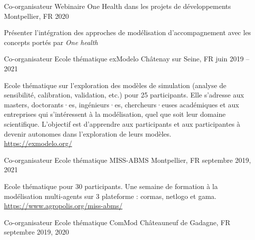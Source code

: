 \begin{cventries}
      \cventry
        {Co-organisateur} %
        {Webinaire One Health dans les projets de développements} %
        {Montpellier, FR} %
        {2020} %
        {
          \begin{cvitems} %
            Présenter l'intégration des approches de modélisation d'accompagnement avec les concepts portés par \textit{One health}
          \end{cvitems}
        }

    \cventry
      {Co-organisateur} %
      {Ecole thématique exModelo} %
      {Châtenay sur Seine, FR} %
      {juin 2019 -- 2021} %
      {
        \begin{cvitems} %
          Ecole thématique sur l’exploration des modèles de simulation (analyse de sensibilité, calibration, validation, etc.) pour 25 participants. Elle s’adresse aux masters, doctorants·es, ingénieurs·es, chercheurs·euses académiques et aux entreprises qui s’intéressent à la modélisation, quel que soit leur domaine scientifique. L’objectif est d’apprendre aux participants et aux participantes à devenir autonomes dans l’exploration de leurs modèles.\\
          \url{https://exmodelo.org/}
          \end{cvitems}
      }
    \cventry
      {Co-organisateur} %
      {Ecole thématique MISS-ABMS} %
      {Montpellier, FR} %
      {septembre 2019, 2021} %
      {
      \begin{cvitems} %
        Ecole thématique pour 30 participants. Une semaine de formation à la modélisation multi-agents sur 3 plateforme : cormas, netlogo et gama.\\
        \url{https://www.agropolis.org/miss-abms/}
      \end{cvitems}
      }
    \cventry
      {Co-organisateur} %
      {Ecole thématique ComMod} %
      {Châteauneuf de Gadagne, FR} %
      {septembre 2019, 2020} %
      {
      \begin{cvitems} %

\end{cvitems}}
\end{cventries}
